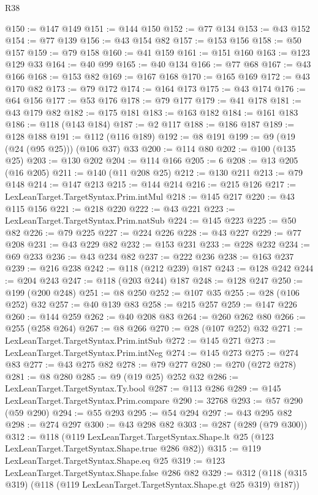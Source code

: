\begin{lexlean}{R38}
\begin{coremodule}
@150 := @147 @149
@151 := @144 @150
@152 := @77 @134
@153 := @43 @152
@154 := @77 @139
@156 := @43 @154 @82
@157 := @153 @156
@158 := @50 @157
@159 := @79 @158
@160 := @41 @159
@161 := @151 @160
@163 := @123 @129 @33
@164 := @40 @99
@165 := @40 @134
@166 := @77 @68
@167 := @43 @166
@168 := @153 @82
@169 := @167 @168
@170 := @165 @169
@172 := @43 @170 @82
@173 := @79 @172
@174 := @164 @173
@175 := @43 @174
@176 := @64 @156
@177 := @53 @176
@178 := @79 @177
@179 := @41 @178
@181 := @43 @179 @82
@182 := @175 @181
@183 := @163 @182
@184 := @161 @183
@186 := @118 (@143 @184)
@187 := @2 @117
@188 := @186 @187
@189 := @128 @188
@191 := @112 (@116 @189)
@192 := @8 @191
@199 := @9 (@19 (@24 (@95 @25))) (@106 @37) @33
@200 := @114 @80
@202 := @100 (@135 @25)
@203 := @130 @202
@204 := @114 @166
@205 := 6
@208 := @13 @205 (@16 @205)
@211 := @140 (@11 @208 @25)
@212 := @130 @211
@213 := @79 @148
@214 := @147 @213
@215 := @144 @214
@216 := @215 @126
@217 := LexLeanTarget.TargetSyntax.Prim.intMul
@218 := @145 @217
@220 := @43 @115 @156
@221 := @218 @220
@222 := @43 @221
@223 := LexLeanTarget.TargetSyntax.Prim.natSub
@224 := @145 @223
@225 := @50 @82
@226 := @79 @225
@227 := @224 @226
@228 := @43 @227
@229 := @77 @208
@231 := @43 @229 @82
@232 := @153 @231
@233 := @228 @232
@234 := @69 @233
@236 := @43 @234 @82
@237 := @222 @236
@238 := @163 @237
@239 := @216 @238
@242 := @118 (@212 @239) @187
@243 := @128 @242
@244 := @204 @243
@247 := @118 (@203 @244) @187
@248 := @128 @247
@250 := @199 (@200 @248)
@251 := @8 @250
@252 := @107 @35
@255 := @28 (@106 @252) @32
@257 := @40 @139 @83
@258 := @215 @257
@259 := @147 @226
@260 := @144 @259
@262 := @40 @208 @83
@264 := @260 @262 @80
@266 := @255 (@258 @264)
@267 := @8 @266
@270 := @28 (@107 @252) @32
@271 := LexLeanTarget.TargetSyntax.Prim.intSub
@272 := @145 @271
@273 := LexLeanTarget.TargetSyntax.Prim.intNeg
@274 := @145 @273
@275 := @274 @83
@277 := @43 @275 @82
@278 := @79 @277
@280 := @270 (@272 @278)
@281 := @8 @280
@285 := @9 (@19 @25) @252 @32
@286 := LexLeanTarget.TargetSyntax.Ty.bool
@287 := @113 @286
@289 := @145 LexLeanTarget.TargetSyntax.Prim.compare
@290 := 32768
@293 := @57 @290 (@59 @290)
@294 := @55 @293
@295 := @54 @294
@297 := @43 @295 @82
@298 := @274 @297
@300 := @43 @298 @82
@303 := @287 (@289 (@79 @300))
@312 := @118
    (@119
      LexLeanTarget.TargetSyntax.Shape.lt
      @25
      (@123 LexLeanTarget.TargetSyntax.Shape.true @286 @82))
@315 := @119 LexLeanTarget.TargetSyntax.Shape.eq @25
@319 := @123 LexLeanTarget.TargetSyntax.Shape.false @286 @82
@329 := @312 (@118 (@315 @319) (@118 (@119 LexLeanTarget.TargetSyntax.Shape.gt @25 @319) @187))

\end{coremodule}
\end{lexlean}
